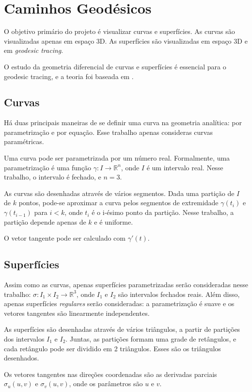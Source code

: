 \chapter{Caminhos Geodésicos}
\label{geomdiff}
O objetivo primário do projeto é visualizar curvas e superfícies.
As curvas são visualizadas apenas em espaço 3D.
As superfícies são visualizadas em espaço 3D e em \textit{geodesic tracing}.

O estudo da geometria diferencial de curvas e superfícies é
essencial para o geodesic tracing, e a teoria foi baseada em \cite{GeomDiff:1}.

\section{Curvas}
Há duas principais maneiras de se definir uma curva na geometria analítica:
por parametrização e por equação. Esse trabalho apenas consideras curvas paramétricas.

Uma curva pode ser parametrizada por um número real.
Formalmente, uma parametrização é uma função $\gamma : I \rightarrow \mathbb{R}^n$, onde $I$ é um intervalo real.
Nesse trabalho, o intervalo é fechado, e $n=3$.

As curvas são desenhadas através de vários segmentos.
Dada uma partição de $I$ de $k$ pontos,
pode-se aproximar a curva pelos segmentos de extremidade $\gamma(t_{i})$ e $\gamma(t_{i-1})$ para $i<k$,
onde $t_i$ é o i-ésimo ponto da partição. Nesse trabalho, a partição depende apenas de $k$ e é uniforme.

O vetor tangente pode ser calculado com $\gamma'(t)$.

\section{Superfícies}
Assim como as curvas, apenas superfícies parametrizadas serão consideradas nesse trabalho:
$\sigma :  I_1 \times I_2 \rightarrow \mathbb{R}^3$, onde $I_1$ e $I_2$ são intervalos fechados reais.
Além disso, apenas superfícies \textit{regulares} serão consideradas: a parametrização é suave e
os vetores tangentes são linearmente independentes.

As superfícies são desenhadas através de vários triângulos,
a partir de partições dos intervalos $I_1$ e $I_2$.
Juntas, as partições formam uma grade de retângulos, e cada retângulo pode ser dividido em 2 triângulos.
Esses são os triângulos desenhados.

Os vetores tangentes nas direções coordenadas são as derivadas parciais $\sigma_u(u,v)$ e $\sigma_v(u,v)$, onde os parâmetros são $u$ e $v$.

